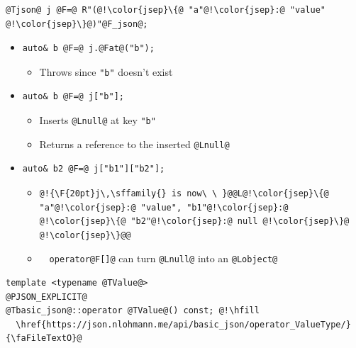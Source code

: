\documentclass{slides}
\makeatletter
\newcommand{\@slidetitle}{}
\newcommand{\slidetitle}[1]{\renewcommand{\@slidetitle}{#1}}
\makeatother
\begin{document}
\vspace{1em}
\begin{lstlisting}
@Tjson@ j @F=@ R"(@!\color{jsep}\{@ "a"@!\color{jsep}:@ "value" @!\color{jsep}\}@)"@F_json@;
\end{lstlisting}
\vspace{-0.5em}

\begin{itemize}[itemsep=0.5em]
  \item \begin{lstlisting}
auto& b @F=@ j.@Fat@("b");
    \end{lstlisting}
    \begin{itemize}
      \item Throws since \lstinline{"b"} doesn't exist
    \end{itemize}

  \item \begin{lstlisting}
auto& b @F=@ j["b"];
    \end{lstlisting}
    \begin{itemize}
      \item Inserts \lstinline{@Lnull@} at key \lstinline{"b"}
      \item Returns a reference to the inserted \lstinline{@Lnull@}
    \end{itemize}

  \item \begin{lstlisting}
auto& b2 @F=@ j["b1"]["b2"];
    \end{lstlisting}
    \begin{itemize}
      \item {\F{16pt}\begin{lstlisting}
@!{\F{20pt}j\,\sffamily{} is now\ \ }@@L@!\color{jsep}\{@ "a"@!\color{jsep}:@ "value", "b1"@!\color{jsep}:@ @!\color{jsep}\{@ "b2"@!\color{jsep}:@ null @!\color{jsep}\}@ @!\color{jsep}\}@@
        \end{lstlisting}}
      \item {\color{orange}\faWarning}\ \ \lstinline{operator@F[]@} can turn
        \lstinline{@Lnull@} into an \lstinline{@Lobject@}
    \end{itemize}
\end{itemize}


\pagebreak
\slidetitle{Value access}

\begin{tcolorbox}
\begin{lstlisting}
template <typename @TValue@>
@PJSON_EXPLICIT@
@Tbasic_json@::operator @TValue@() const; @!\hfill
  \href{https://json.nlohmann.me/api/basic_json/operator_ValueType/}{\faFileTextO}@
\end{lstlisting}
\end{tcolorbox}
\vspace{0em}
\end{document}
